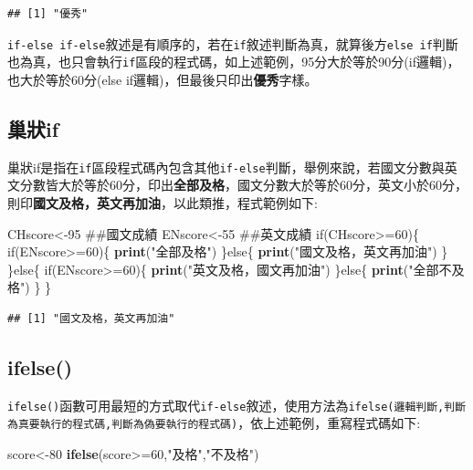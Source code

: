 \documentclass[]{book}
\newenvironment{Shaded}{\begin{snugshade}}{\end{snugshade}}
\newcommand{\KeywordTok}[1]{\textcolor[rgb]{0.13,0.29,0.53}{\textbf{{#1}}}}
\newcommand{\DecValTok}[1]{\textcolor[rgb]{0.00,0.00,0.81}{{#1}}}
\newcommand{\StringTok}[1]{\textcolor[rgb]{0.31,0.60,0.02}{{#1}}}
\newcommand{\NormalTok}[1]{{#1}}
\theoremstyle{definition}
\theoremstyle{definition}
\theoremstyle{remark}
\begin{document}
\begin{verbatim}
## [1] "優秀"
\end{verbatim}

\texttt{if-else\ if-else}敘述是有順序的，若在\texttt{if}敘述判斷為真，就算後方\texttt{else\ if}判斷也為真，也只會執行\texttt{if}區段的程式碼，如上述範例，95分大於等於90分(if邏輯)，也大於等於60分(else
if邏輯)，但最後只印出\textbf{優秀}字樣。

\subsection{巢狀if}\label{if}

巢狀if是指在\texttt{if}區段程式碼內包含其他\texttt{if-else}判斷，舉例來說，若國文分數與英文分數皆大於等於60分，印出\textbf{全部及格}，國文分數大於等於60分，英文小於60分，則印\textbf{國文及格，英文再加油}，以此類推，程式範例如下:

\begin{Shaded}
\begin{Highlighting}[]
\NormalTok{CHscore<-}\DecValTok{95} \NormalTok{##國文成績}
\NormalTok{ENscore<-}\DecValTok{55} \NormalTok{##英文成績}
\NormalTok{if(CHscore>=}\DecValTok{60}\NormalTok{)\{}
  \NormalTok{if(ENscore>=}\DecValTok{60}\NormalTok{)\{}
    \KeywordTok{print}\NormalTok{(}\StringTok{"全部及格"}\NormalTok{)}
  \NormalTok{\}else\{}
    \KeywordTok{print}\NormalTok{(}\StringTok{"國文及格，英文再加油"}\NormalTok{)}
  \NormalTok{\}}
\NormalTok{\}else\{}
  \NormalTok{if(ENscore>=}\DecValTok{60}\NormalTok{)\{}
    \KeywordTok{print}\NormalTok{(}\StringTok{"英文及格，國文再加油"}\NormalTok{)}
  \NormalTok{\}else\{}
    \KeywordTok{print}\NormalTok{(}\StringTok{"全部不及格"}\NormalTok{)}
  \NormalTok{\}}
\NormalTok{\}}
\end{Highlighting}
\end{Shaded}

\begin{verbatim}
## [1] "國文及格，英文再加油"
\end{verbatim}

\subsection{ifelse()}\label{ifelse}

\texttt{ifelse()}函數可用最短的方式取代\texttt{if-else}敘述，使用方法為\texttt{ifelse(邏輯判斷,判斷為真要執行的程式碼,判斷為偽要執行的程式碼)}，依上述範例，重寫程式碼如下:

\begin{Shaded}
\begin{Highlighting}[]
\NormalTok{score<-}\DecValTok{80}
\KeywordTok{ifelse}\NormalTok{(score>=}\DecValTok{60}\NormalTok{,}\StringTok{"及格"}\NormalTok{,}\StringTok{"不及格"}\NormalTok{)}
\end{Highlighting}
\end{Shaded}
\end{document}
